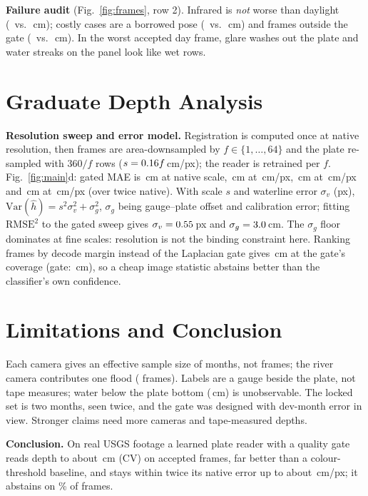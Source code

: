 \documentclass{article}
\begin{document}
\textbf{Failure audit} (Fig.~\ref{fig:frames}, row 2). Infrared is \emph{not} worse than daylight (\maeIR\ vs.\ \maeDay\,cm); costly cases are a borrowed pose (\maeBorrowed\ vs.\ \maeRegistered\,cm) and frames outside the gate (\maeFailGate\ vs.\ \maePassGate\,cm). In the worst accepted day frame, glare washes out the plate and water streaks on the panel look like wet rows.

\section{Graduate Depth Analysis}
\textbf{Resolution sweep and error model.} Registration is computed once at native resolution, then frames are area-downsampled by $f\in\{1,\ldots,64\}$ and the plate re-sampled with $360/f$ rows ($s=0.16 f$\,cm/px); the reader is retrained per $f$. Fig.~\ref{fig:main}d: gated MAE is \resMaeA\,cm at native scale, \resMaeE\,cm at \resSE\,cm/px, \resMaeF\,cm at \resSF\,cm/px and \resMaeG\,cm at \resSG\,cm/px (over twice native). With scale $s$ and waterline error $\sigma_v$ (px), $\mathrm{Var}(\hat h)=s^2\sigma_v^2+\sigma_g^2$, $\sigma_g$ being gauge--plate offset and calibration error; fitting $\mathrm{RMSE}^2$ to the gated sweep gives $\sigma_v=0.55$\,px and $\sigma_g=3.0$\,cm. The $\sigma_g$ floor dominates at fine scales: resolution is not the binding constraint here. Ranking frames by decode margin instead of the Laplacian gate gives \marginMaeAtCov\,cm at the gate's coverage (gate: \maePassGate\,cm), so a cheap image statistic abstains better than the classifier's own confidence.


\section{Limitations and Conclusion}\label{sec:limits}
Each camera gives an effective sample size of months, not frames; the river camera contributes one flood (\hancN{} frames). Labels are a gauge beside the plate, not tape measures; water below the plate bottom (\plateBottomCm\,cm) is unobservable. The locked set is two months, seen twice, and the gate was designed with dev-month error in view. Stronger claims need more cameras and tape-measured depths.

\textbf{Conclusion.} On real USGS footage a learned plate reader with a quality gate reads depth to about \maeDevGated\,cm (CV) on accepted frames, far better than a colour-threshold baseline, and stays within twice its native error up to about \resSF\,cm/px; it abstains on \dropDev\% of frames.
\end{document}
